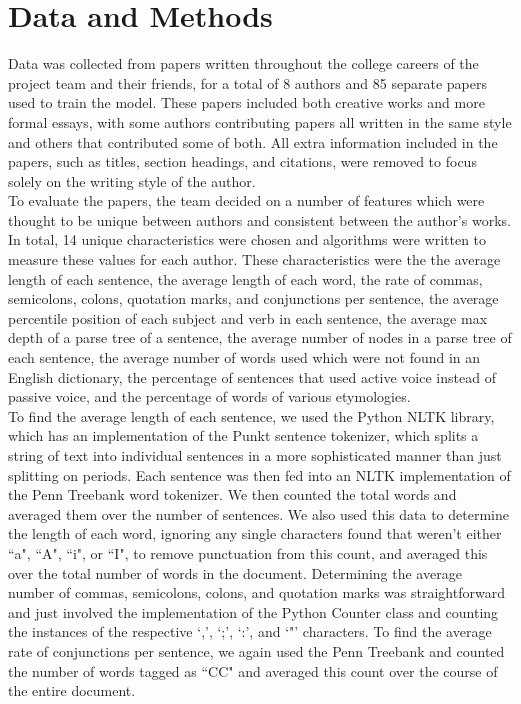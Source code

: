 \documentclass[twocolumn]{article}
\begin{document}
  \section{Data and Methods}
  Data was collected from papers written throughout the college careers of the project team and their friends, for a total of 8 authors and 85 separate papers used to train the model. These papers included both creative works and more formal essays, with some authors contributing papers all written in the same style and others that contributed some of both. All extra information included in the papers, such as titles, section headings, and citations, were removed to focus solely on the writing style of the author. \\
  
  To evaluate the papers, the team decided on a number of features which were thought to be unique between authors and consistent between the author's works. In total, 14 unique characteristics were chosen and algorithms were written to measure these values for each author. These characteristics were the the average length of each sentence, the average length of each word, the rate of commas, semicolons, colons, quotation marks, and conjunctions per sentence, the average percentile position of each subject and verb in each sentence, the average max depth of a parse tree of a sentence, the average number of nodes in a parse tree of each sentence, the average number of words used which were not found in an English dictionary, the percentage of sentences that used active voice instead of passive voice, and the percentage of words of various etymologies. \\
  
  To find the average length of each sentence, we used the Python NLTK library, which has an implementation of the Punkt sentence tokenizer, which splits a string of text into individual sentences in a more sophisticated manner than just splitting on periods. Each sentence was then fed into an NLTK implementation of the Penn Treebank word tokenizer. We then counted the total words and averaged them over the number of sentences. We also used this data to determine the length of each word, ignoring any single characters found that weren't either ``a", ``A", ``i", or ``I", to remove punctuation from this count, and averaged this over the total number of words in the document. Determining the average number of commas, semicolons, colons, and quotation marks was straightforward and just involved the implementation of the Python Counter class and counting the instances of the respective `,', `;', `:', and `"' characters.  To find the average rate of conjunctions per sentence, we again used the Penn Treebank and counted the number of words tagged as ``CC" and averaged this count over the course of the entire document. \\
  
\end{document}
